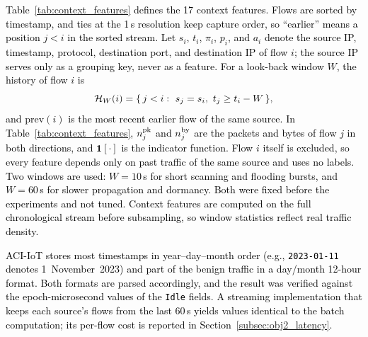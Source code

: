 \documentclass[conference]{IEEEtran}
\begin{document}
\textcolor{black}{Table~\ref{tab:context_features} defines
the 17 context features. Flows are sorted by timestamp, and ties at
the 1\,s resolution keep capture order, so ``earlier'' means a
position $j<i$ in the sorted stream. Let $s_i$, $t_i$, $\pi_i$,
$p_i$, and $a_i$ denote the source IP, timestamp, protocol,
destination port, and destination IP of flow $i$; the source IP
serves only as a grouping key, never as a feature. For a look-back
window $W$, the history of flow $i$ is}
\begin{equation}
\textcolor{black}{\mathcal{H}_W(i)=\{\,j<i:\ s_j=s_i,\ t_j\ge t_i-W\,\},}
\label{eq:context_history}
\end{equation}
\textcolor{black}{and $\mathrm{prev}(i)$ is the most recent
earlier flow of the same source. In Table~\ref{tab:context_features},
$n^{\rm pk}_j$ and $n^{\rm by}_j$ are the packets and bytes of flow
$j$ in both directions, and $\mathbf{1}[\cdot]$ is the indicator
function. Flow $i$ itself is excluded, so
every feature depends only on past traffic of the same source and
uses no labels. Two windows are used: $W=10$\,s for short scanning
and flooding bursts, and $W=60$\,s for slower propagation and
dormancy. Both were fixed before the experiments and not tuned.
Context features are computed on the full chronological stream
before subsampling, so window statistics reflect real traffic
density.}

\textcolor{black}{ACI-IoT stores most timestamps in
year--day--month order (e.g., \texttt{2023-01-11} denotes
1~November~2023) and part of the benign traffic in a day/month
12-hour format. Both formats are parsed accordingly, and the result
was verified against the epoch-microsecond values of the
\texttt{Idle} fields. A streaming implementation that keeps each
source's flows from the last 60\,s yields values identical to the
batch computation; its per-flow cost is reported in
Section~\ref{subsec:obj2_latency}.}
\end{document}
